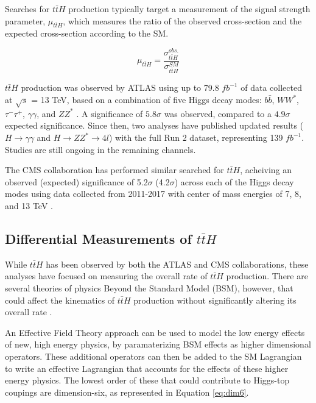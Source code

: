 Searches for $t\bar{t}H$ production typically target a measurement of the signal strength parameter, $\mu_{t\bar{t}H}$, which measures the ratio of the observed cross-section and the expected cross-section according to the SM.

\begin{equation}
        \mu_{t\bar{t}H} = \frac{\sigma^{obs.}_{t\bar{t}H}}{\sigma^{SM}_{t\bar{t}H}}
\end{equation}

$t\bar{t}H$ production was observed by ATLAS using up to 79.8 $fb^{-1}$ of data collected at $\sqrt{s}$ = 13 TeV, based on a combination of five Higgs decay modes: $b\bar{b}$, $WW^*$, $\tau^{-}\tau^{+}$, $\gamma\gamma$, and $ZZ^*$ \cite{Higgs_combo}. A significance of $5.8\sigma$ was observed, compared to a $4.9\sigma$ expected significance. Since then, two analyses have published updated results ($H\rightarrow \gamma\gamma$ and $H\rightarrow ZZ^*\rightarrow 4l$) with the full Run 2 dataset, representing 139 $fb^{-1}$. Studies are still ongoing in the remaining channels.

The CMS collaboration has performed similar searched for $t\bar{t}H$, acheiving an observed (expected) significance of 5.2$\sigma$ (4.2$\sigma$) across each of the Higgs decay modes using data collected from 2011-2017 with center of mass energies of 7, 8, and 13 TeV \cite{PhysRevLett.120.231801}. 


\subsection{Differential Measurements of $t\bar{t}H$}
\label{sec:bsm}

While $t\bar{t}H$ has been observed by both the ATLAS \cite{ttH_paper} and CMS \cite{Sirunyan_2018} collaborations, these analyses have focused on measuring the overall rate of $t\bar{t}H$ production. There are several theories of physics Beyond the Standard Model (BSM), however, that could affect the kinematics of $t\bar{t}H$ production without significantly altering its overall rate \cite{Dumont_2013}.

An Effective Field Theory approach can be used to model the low energy effects of new, high energy physics, by paramaterizing BSM effects as higher dimensional operators. These additional operators can then be added to the SM Lagrangian to write an effective Lagrangian that accounts for the effects of these higher energy physics. The lowest order of these that could contribute to Higgs-top coupings are dimension-six, as represented in Equation \ref{eq:dim6}.

